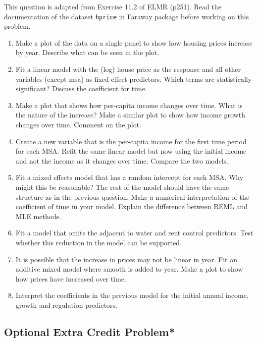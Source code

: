 \documentclass[
]{article}
\begin{document}
This question is adapted from Exercise 11.2 of ELMR (p251). Read the
documentation of the dataset \texttt{hprice} in Faraway package before
working on this problem.

\begin{enumerate}
\def\labelenumi{\arabic{enumi}.}
\item
  Make a plot of the data on a single panel to show how housing prices
  increase by year. Describe what can be seen in the plot.
\item
  Fit a linear model with the (log) house price as the response and all
  other variables (except msa) as fixed effect predictors. Which terms
  are statistically significant? Discuss the coefficient for time.
\item
  Make a plot that shows how per-capita income changes over time. What
  is the nature of the increase? Make a similar plot to show how income
  growth changes over time. Comment on the plot.
\item
  Create a new variable that is the per-capita income for the first time
  period for each MSA. Refit the same linear model but now using the
  initial income and not the income as it changes over time. Compare the
  two models.
\item
  Fit a mixed effects model that has a random intercept for each MSA.
  Why might this be reasonable? The rest of the model should have the
  same structure as in the previous question. Make a numerical
  interpretation of the coefficient of time in your model. Explain the
  difference between REML and MLE methods.
\item
  Fit a model that omits the adjacent to water and rent control
  predictors. Test whether this reduction in the model can be supported.
\item
  It is possible that the increase in prices may not be linear in year.
  Fit an additive mixed model where smooth is added to year. Make a plot
  to show how prices have increased over time.
\item
  Interpret the coefficients in the previous model for the initial
  annual income, growth and regulation predictors.
\end{enumerate}

\hypertarget{optional-extra-credit-problem}{%
\subsection{Optional Extra Credit
Problem*}\label{optional-extra-credit-problem}}
\end{document}

